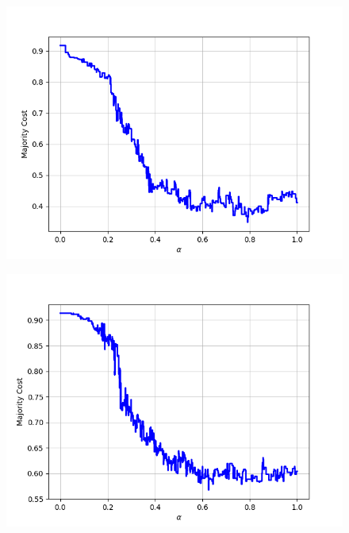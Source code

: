 \begin{figure}[H]
\centering
\begin{minipage}{.24\textwidth}
  \centering
  {\includegraphics[width=\linewidth]{plots/omniglot-intra-sc-cnn/Alphabet_of_the_Magi}}
\end{minipage}
\begin{minipage}{.24\textwidth}
  \centering
  {\includegraphics[width=\linewidth]{plots/omniglot-intra-sc-cnn/Anglo-Saxon_Futhorc}}
\end{minipage}
\begin{minipage}{.24\textwidth}
  \centering

\end{minipage}
\end{figure}
